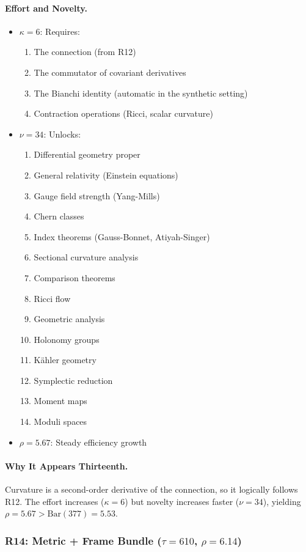 \documentclass[11pt]{article}
\theoremstyle{definition}
\begin{document}
\paragraph{Effort and Novelty.}
\begin{itemize}
\item $\kappa = 6$: Requires:
\begin{enumerate}
\item The connection (from R12)
\item The commutator of covariant derivatives
\item The Bianchi identity (automatic in the synthetic setting)
\item Contraction operations (Ricci, scalar curvature)
\end{enumerate}
\item $\nu = 34$: Unlocks:
\begin{enumerate}
\item Differential geometry proper
\item General relativity (Einstein equations)
\item Gauge field strength (Yang-Mills)
\item Chern classes
\item Index theorems (Gauss-Bonnet, Atiyah-Singer)
\item Sectional curvature analysis
\item Comparison theorems
\item Ricci flow
\item Geometric analysis
\item Holonomy groups
\item Kähler geometry
\item Symplectic reduction
\item Moment maps
\item Moduli spaces
\end{enumerate}
\item $\rho = 5.67$: Steady efficiency growth
\end{itemize}

\paragraph{Why It Appears Thirteenth.}
Curvature is a second-order derivative of the connection, so it logically follows R12. The effort increases ($\kappa=6$) but novelty increases faster ($\nu=34$), yielding $\rho=5.67 > \text{Bar}(377) = 5.53$.

\subsubsection{R14: Metric + Frame Bundle ($\tau=610$, $\rho=6.14$)}
\end{document}
